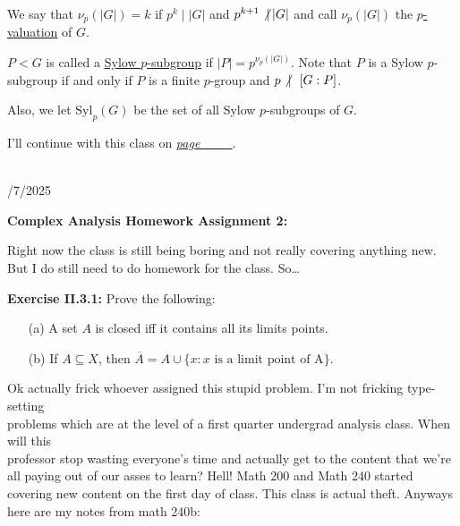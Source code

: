 \documentclass{book}
\newcommand{\inLinkRap}[2]{{\color{blue}\hyperlink{#1}{\textit{#2}}}}
\newcommand{\hTwo}{%
\color{Black}%
   \fontsize{13}{15}\selectfont%
}
\newcommand{\Hstatement}{%
   \color{MidnightBlue!90!Black}%
   \fontsize{12}{13}\selectfont%
}
\newcommand{\HexOne}{%
   \color{Purple}%
   \fontsize{12}{13}\selectfont%
}
\newenvironment{myIndent}{%
   \begin{adjustwidth}{2.5em}{0em}%
}{%
   \end{adjustwidth}%
}
\newcommand{\udefine}[1]{{%
   \setulcolor{Red}%
   \setul{0.14em}{0.07em}%
   \ul{#1}%
}}
\newcommand{\blab}[1]{\textbf{#1}}
\newcommand{\blect}[1]{{\color{MidnightBlue}\textbf{#1}}}
\newcommand{\gap}{\phantom{2}}
\newcommand{\divides}{\mathop{\mid}}
\newcommand{\Syl}{\mathrm{Syl}}
\newcommand{\mySepTwo}[1][.]{%
   {\noindent\color{#1}{\rule{6.5in}{0.5mm}}}\\%
}
\newcommand{\retTwo}{\hfill\bigbreak}
\newcommand{\dispDate}[1]{{
   \color{Black}%
   \fontsize{20}{18}\selectfont%
   #1\retTwo
}}
\begin{document}
\hTwo We say that $\nu_p(|G|) = k$ if $p^k \divides |G|$ and $p^{k+1} \not\divides |G|$ and call $\nu_p(|G|)$ the \udefine{$p$-valuation} of $G$.\retTwo

$P < G$ is called a \udefine{Sylow $p$-subgroup} if $|P| = p^{\nu_p(|G|)}$. Note that $P$ is a Sylow $p$-subgroup if and only if $P$ is a finite $p$-group and $p \not\divides\gap [G : P]$.\retTwo

Also, we let $\Syl_p(G)$ be the set of all Sylow $p$-subgroups of $G$.\retTwo

I'll continue with this class on \inLinkRap{math 200a lecture 6}{page \_\_\_}.

\mySepTwo

\dispDate{10/7/2025}

\hypertarget{math 220a lecture 3}{\blect{Complex Analysis Homework Assignment 2:}}\retTwo

Right now the class is still being boring and not really covering anything new. But I do still need to do homework for the class. So\dots\retTwo

\Hstatement\blab{Exercise II.3.1:} Prove the following:
\begin{itemize}
	\item[(a)] A set $A$ is closed iff it contains all its limits points.
	\item[(b)] If $A \subseteq X$, then $\overline{A} = A \cup \{x : x \text{ is a limit point of A}\}$.
\end{itemize}

\HexOne
\begin{myIndent}
	Ok actually frick whoever assigned this stupid problem. I'm not fricking type-setting\\ problems which are at the level of a first quarter undergrad analysis class. When will this\\ professor stop wasting everyone's time and actually get to the content that we're all paying out of our asses to learn? Hell! Math 200 and Math 240 started covering new content on the first day of class. This class is actual theft. Anyways here are my notes from math 240b:\newpage
\end{myIndent}
\end{document}
